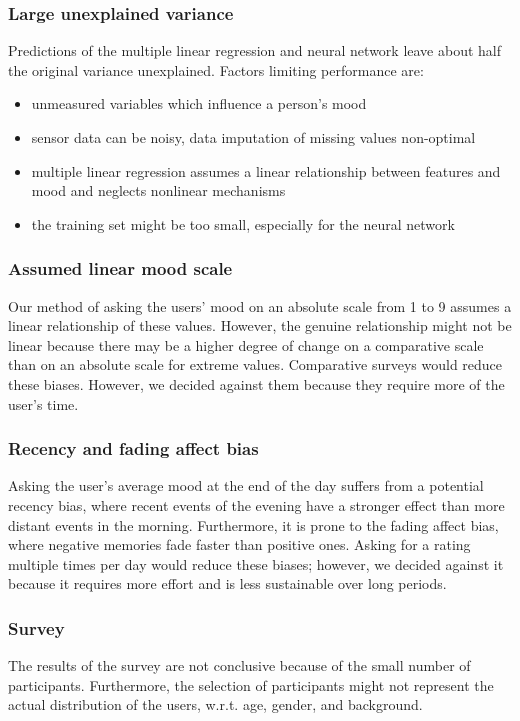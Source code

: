 \documentclass[conference]{IEEEtran}
\begin{document}
\subsubsection{Large unexplained variance}
Predictions of the multiple linear regression and neural network leave about half the original variance unexplained. 
Factors limiting performance are:
\begin{itemize}
    \item unmeasured variables which influence a person's mood
    \item sensor data can be noisy, data imputation of missing values non-optimal
    \item multiple linear regression assumes a linear relationship between features and mood and neglects nonlinear mechanisms
    \item the training set might be too small, especially for the neural network
\end{itemize}


\subsubsection{Assumed linear mood scale}
Our method of asking the users' mood on an absolute scale from 1 to 9 assumes a linear relationship of these values. However, the genuine relationship might not be linear because there may be a higher degree of change on a comparative scale than on an absolute scale for extreme values\cite{carlsson_assessment_1983}.
Comparative surveys would reduce these biases. However, we decided against them because they require more of the user's time.


\subsubsection{Recency and fading affect bias}
Asking the user's average mood at the end of the day suffers from a potential recency bias\cite{cushing_barry_e_mitigation_1996}, where recent events of the evening have a stronger effect than more distant events in the morning. Furthermore, it is prone to the fading affect bias, where negative memories fade faster than positive ones\cite{skowronski_chapter_2014}.
Asking for a rating multiple times per day would reduce these biases; however, we decided against it because it requires more effort and is less sustainable over long periods.  


\subsubsection{Survey}
The results of the survey are not conclusive because of the small number of participants. Furthermore, the selection of participants might not represent the actual distribution of the users, w.r.t. age, gender, and background.
\end{document}
